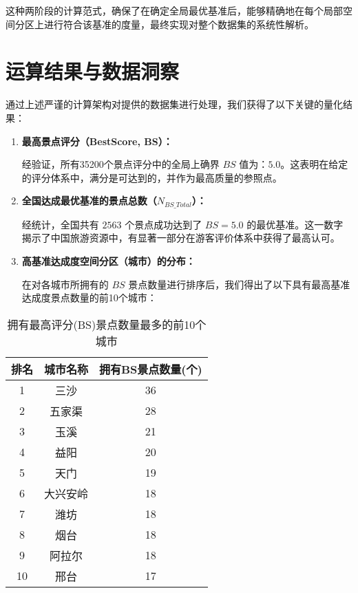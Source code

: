 \documentclass[12pt]{article}
\begin{document}
这种两阶段的计算范式，确保了在确定全局最优基准后，能够精确地在每个局部空间分区上进行符合该基准的度量，最终实现对整个数据集的系统性解析。

\section{运算结果与数据洞察}

通过上述严谨的计算架构对提供的数据集进行处理，我们获得了以下关键的量化结果：

\begin{enumerate}
    \item \textbf{最高景点评分（BestScore, BS）：}
    
    经验证，所有35200个景点评分中的全局上确界 $BS$ 值为：$5.0$。这表明在给定的评分体系中，满分是可达到的，并作为最高质量的参照点。

    \item \textbf{全国达成最优基准的景点总数（$N_{BS\_Total}$）：}
    
    经统计，全国共有 $2563$ 个景点成功达到了 $BS=5.0$ 的最优基准。这一数字揭示了中国旅游资源中，有显著一部分在游客评价体系中获得了最高认可。

    \item \textbf{高基准达成度空间分区（城市）的分布：}
    
    在对各城市所拥有的 $BS$ 景点数量进行排序后，我们得出了以下具有最高基准达成度景点数量的前10个城市：
\end{enumerate}

\begin{table}[H]
\centering
\caption{拥有最高评分(BS)景点数量最多的前10个城市}
\label{tab:top10cities}
\begin{tabular}{ccc}
\toprule
排名 & 城市名称 & 拥有BS景点数量(个) \\
\midrule
1    & 三沙     & 36                   \\
2    & 五家渠   & 28                   \\
3    & 玉溪     & 21                   \\
4    & 益阳     & 20                   \\
5    & 天门     & 19                   \\
6    & 大兴安岭 & 18                   \\
7    & 潍坊     & 18                   \\
8    & 烟台     & 18                   \\
9    & 阿拉尔   & 18                   \\
10   & 邢台     & 17                   \\
\bottomrule
\end{tabular}
\end{table}
\end{document}
